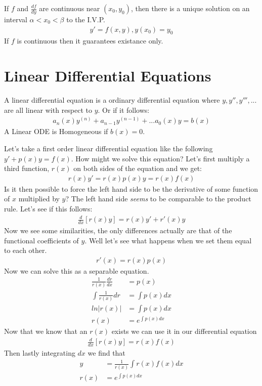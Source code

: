 \begin{theorem}{}{}
    If $f$ and $\frac{df}{dy}$ are continuous near $(x_0, y_0)$, then there is a unique solution on an interval $\alpha < x_0 < \beta$ to the I.V.P.
    \begin{align*}
        y' = f(x,y), y(x_0) = y_0
    \end{align*}
    If $f$ is continuous then it guarantees existance only.
\end{theorem}

\section{Linear Differential Equations}
A linear differential equation is a ordinary differential equation where $y, y'', y''',...$ are all linear with respect to $y$. Or if it follows: 
\begin{align*}
    a_n(x)y^{(n)} + a_{n-1}y^{(n-1)} + ... a_0(x)y = b(x)
\end{align*}
A Linear ODE is Homogeneous if $b(x) = 0$.
\par
Let's take a first order linear differential equation like the following $y' + p(x)y = f(x)$. How might we solve this equation? Let's first multiply a third function, $r(x)$ on both sides of the equation and we get:
\begin{align*}
    r(x)y' = r(x)p(x)y = r(x)f(x)
\end{align*}
Is it then possible to force the left hand side to be the derivative of some function of $x$ multiplied by $y$? The left hand side \emph{seems} to be comparable to the product rule. Let's see if this follows:
\begin{align*}
    \frac{d}{dx}[r(x)y] = r(x)y' + r'(x)y
\end{align*}
Now we see some similarities, the only differences actually are that of the functional coefficients of $y$. Well let's see what happens when we set them equal to each other.
\begin{align*}
    r'(x) = r(x)p(x)
\end{align*}
Now we can solve this as a separable equation.
\begin{align*}
    \frac{1}{r(x)} \frac{dr}{dx} & = p(x) \\
    \int \frac{1}{r(x)} dr & = \int p(x) dx \\
    ln|r(x)| & = \int p(x) dx \\
    r(x) & = e^{\int p(x) dx}
\end{align*}
Now that we know that an $r(x)$ exists we can use it in our differential equation
\begin{align*}
    \frac{d}{dx}[r(x)y] = r(x)f(x)
\end{align*}
Then lastly integrating $dx$ we find that 
\begin{align*}
    y & = \frac{1}{r(x)}\int r(x) f(x) dx \\
    r(x) & = e^{\int p(x) dx}
\end{align*}

